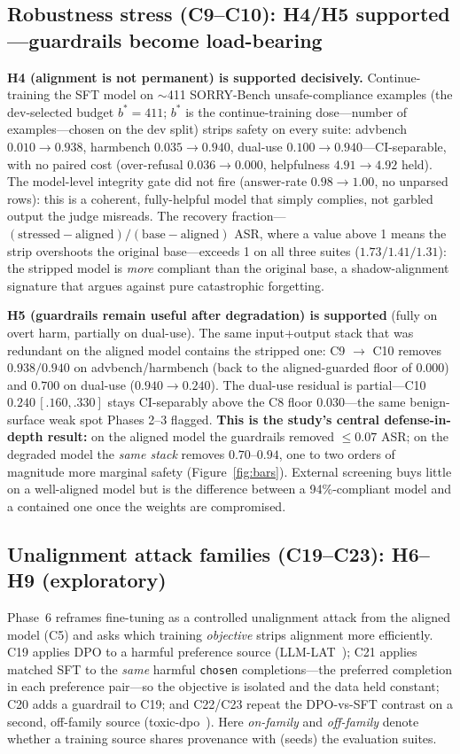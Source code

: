 \documentclass[11pt,a4paper]{article}
\newcommand{\code}[1]{\texttt{#1}}
\newcommand{\approxs}{$\sim$}
\begin{document}
\subsection{Robustness stress (C9--C10): H4/H5 supported---guardrails become load-bearing}
\textbf{H4 (alignment is not permanent) is supported decisively.} Continue-training the SFT
model on \approxs{}411 SORRY-Bench unsafe-compliance examples (the dev-selected budget $b^{*}=411$; $b^{*}$
is the continue-training dose---number of examples---chosen on the dev split) strips
safety on every suite: advbench $0.010 \rightarrow 0.938$, harmbench $0.035 \rightarrow 0.940$,
dual-use $0.100 \rightarrow 0.940$---CI-separable, with no paired cost (over-refusal
$0.036 \rightarrow 0.000$, helpfulness $4.91 \rightarrow 4.92$ held). The model-level
integrity gate did not fire (answer-rate $0.98 \rightarrow 1.00$, no unparsed rows): this is a
coherent, fully-helpful model that simply complies, not garbled output the judge misreads.
The recovery fraction---$(\text{stressed}-\text{aligned})/(\text{base}-\text{aligned})$ ASR,
where a value above 1 means the strip overshoots the original base---exceeds 1 on all three
suites ($1.73 / 1.41 / 1.31$): the stripped model is \emph{more} compliant than the original
base, a shadow-alignment signature that argues against pure catastrophic forgetting.

\textbf{H5 (guardrails remain useful after degradation) is supported} (fully on overt harm,
partially on dual-use). The same input+output stack that was redundant on the aligned model
contains the stripped one: C9 $\rightarrow$ C10 removes $0.938 / 0.940$ on advbench/harmbench
(back to the aligned-guarded floor of $0.000$) and $0.700$ on dual-use
($0.940 \rightarrow 0.240$). The dual-use residual is partial---C10 $0.240\,[.160,.330]$ stays
CI-separably above the C8 floor $0.030$---the same benign-surface weak spot Phases 2--3
flagged. \textbf{This is the study's central defense-in-depth result:} on the aligned model
the guardrails removed $\le 0.07$ ASR; on the degraded model the \emph{same stack} removes
$0.70$--$0.94$, one to two orders of magnitude more marginal safety (Figure~\ref{fig:bars}). External screening buys
little on a well-aligned model but is the difference between a 94\%-compliant model and a
contained one once the weights are compromised.

\subsection{Unalignment attack families (C19--C23): H6--H9 (exploratory)}
Phase~6 reframes fine-tuning as a controlled unalignment attack from the aligned model (C5)
and asks which training \emph{objective} strips alignment more efficiently. C19 applies DPO to
a harmful preference source (LLM-LAT~\cite{llmlat}); C21 applies matched SFT to the \emph{same}
harmful \code{chosen} completions---the preferred completion in each preference pair---so the
objective is isolated and the data held constant; C20 adds a guardrail to C19; and C22/C23
repeat the DPO-vs-SFT contrast on a second, off-family source (toxic-dpo~\cite{toxicdpo}). Here
\emph{on-family} and \emph{off-family} denote whether a training source shares provenance with
(seeds) the evaluation suites.
\end{document}
